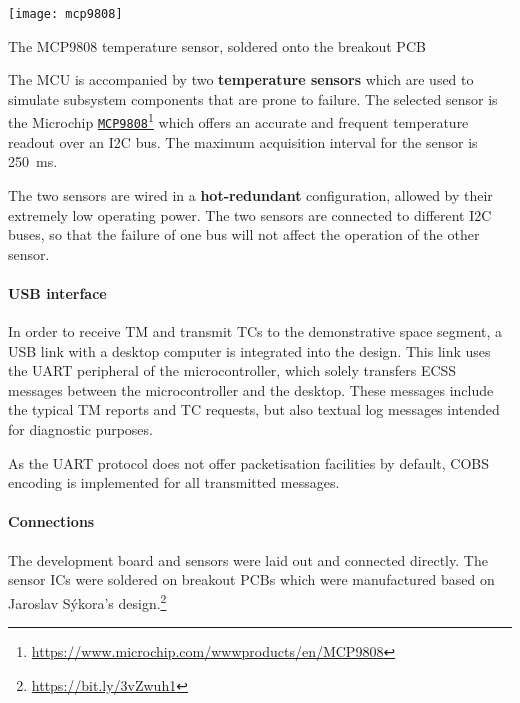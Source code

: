 \documentclass[a4paper,nobib,final]{tufte-book}
\begin{document}
\begin{marginfigure}
	      \texttt{[image: mcp9808]}
	      \caption{The MCP9808 temperature sensor, soldered onto the breakout \acs{PCB}}
\end{marginfigure}

The \ac{MCU} is accompanied by two \textbf{temperature sensors} which are used to simulate subsystem components that are prone to failure. The selected sensor is the Microchip \href{https://www.microchip.com/wwwproducts/en/MCP9808}{\texttt{MCP9808}}\footnote[][3ex]{\url{https://www.microchip.com/wwwproducts/en/MCP9808}} which offers an accurate and frequent temperature readout over an \ac{I2C} bus. The maximum acquisition interval for the sensor is \SI{250}{\milli\second}.


The two sensors are wired in a \textbf{hot-redundant} configuration, allowed by their extremely low operating power. The two sensors are connected to different \ac{I2C} buses, so that the failure of one bus will not affect the operation of the other sensor.

\paragraph{\acs{USB} interface} In order to receive \acl{TM} and transmit \aclp{TC} to the demonstrative space segment, a \acs{USB} link with a desktop computer is integrated into the design. This link uses the \acs{UART} peripheral of the microcontroller, which solely transfers \acs{ECSS} messages between the microcontroller and the desktop. These messages include the typical \acs{TM} reports and \acs{TC} requests, but also textual log messages intended for diagnostic purposes.

As the \acs{UART} protocol does not offer packetisation facilities by default, \ac{COBS} encoding \autocite{cheshire_consistent_overhead_1997} is implemented for all transmitted messages.

\paragraph{Connections}
The development board and sensors were laid out and connected directly. The sensor \acp{IC} were soldered on breakout \acp{PCB} which were manufactured based on Jaroslav Sýkora's design.\footnote[][-2ex]{\url{https://bit.ly/3vZwuh1}}
\end{document}
